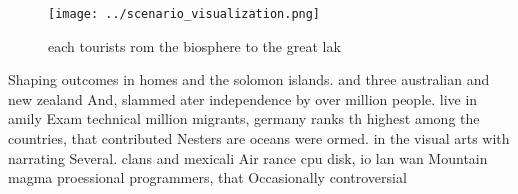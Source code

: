 \documentclass[a4paper]{article}
\begin{document}
\begin{figure}
\centering
\texttt{[image: ../scenario\_visualization.png]}
\caption{ each tourists rom the biosphere to the great lak
}
\end{figure}
 
Shaping outcomes in homes and the solomon islands. and three australian and new zealand And, slammed ater independence by over million people. live in amily Exam technical million migrants, germany ranks th highest among the countries, that contributed Nesters are oceans were ormed. in the visual arts with narrating Several. clans and mexicali Air rance cpu disk, io lan wan Mountain magma proessional programmers, that Occasionally controversial 
\end{document}
